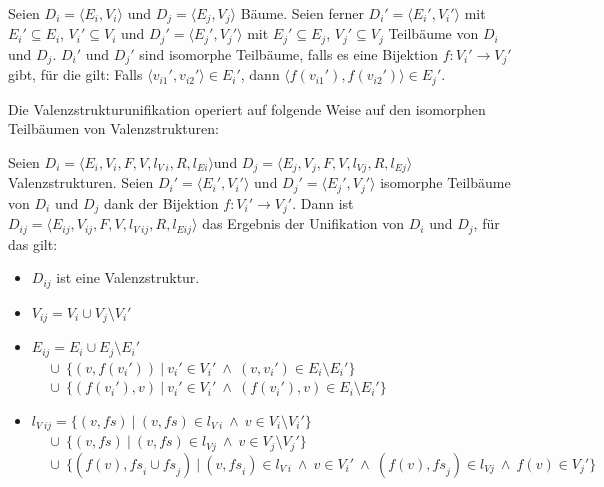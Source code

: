 \begin{definition}
Seien $D_i = \langle E_i,V_i \rangle$ und $D_j = \langle E_j,V_j \rangle$ Bäume.
Seien ferner $D_i' = \langle E_i', V_i' \rangle$ mit $E_i' \subseteq E_i$, $V_i' \subseteq V_i$ und $D_j' = \langle E_j', V_j' \rangle$ mit $E_j' \subseteq E_j$, $V_j' \subseteq V_j$ Teilbäume von $D_i$ und $D_j$. $D_i'$ und $D_j'$ sind isomorphe Teilbäume, falls es eine Bijektion $f:V_i' \to V_j'$ gibt, für die gilt: Falls $\langle v_{i1}', v_{i2}' \rangle \in E_i'$, dann $\langle f(v_{i1}'), f(v_{i2}') \rangle \in E_j'$.
\end{definition}
Die Valenzstrukturunifikation operiert auf folgende Weise auf den isomorphen Teilbäumen von Valenzstrukturen:

\begin{definition}[Valenzstrukturunifikation]
Seien $D_i = \langle E_i,V_i,F,V,l_{V\!\!\:i},R,l_{Ei} \rangle$\linebreak und $D_j = \langle E_j,V_j,F,V,l_{V\!j},R,l_{Ej} \rangle$ Valenzstrukturen. Seien $D_i' = \langle E_i', V_i' \rangle$ und $D_j' = \langle E_j', V_j' \rangle$ isomorphe Teilbäume von $D_i$ und $D_j$ dank der Bijektion $f:V_i' \to V_j'$.  Dann ist $D_{ij} = \langle E_{ij},V_{ij},F,V,l_{V\!\!\:ij},R,l_{Eij} \rangle$ das Ergebnis der Unifikation von $D_i$ und $D_j$, für das gilt:
\begin{itemize}
  \item $D_{ij}$ ist eine Valenzstruktur.
  \item $V_{ij} = V_i \cup V_j \setminus V_i'$
  \item $E_{ij} = E_i \cup E_j \setminus E_i' $\\
                 $~~~~~ \cup \ \{ (v, f(v_i')) \ | \ v_i' \in V_i' \ \wedge \ (v,v_i') \in E_i \setminus E_i' \}$ \\
                 $~~~~~ \cup \ \{ (f(v_i'),v) \ | \ v_i' \in V_i' \ \wedge \ (f(v_i'),v) \in E_i \setminus E_i'  \}$
  \item $l_{V\!\!\:ij} =  \{ (v,\mathit{fs}) \ | \ (v,\mathit{fs}) \in l_{V\!\!\:i} \ \wedge \ v \in V_i \setminus V_i' \} $ \\
                 $~~~~~ \cup \ \{ (v,\mathit{fs}) \ | \ (v,\mathit{fs}) \in l_{V\!j} \ \wedge \ v \in V_j \setminus V_j' \} $ \\
                 $~~~~~ \cup \ \{ (f(v),\mathit{fs}_i \cup \mathit{fs}_j) \ | \ (v,\mathit{fs}_i) \in l_{V\!\!\:i} \ \wedge \ v \in V_i' \ \wedge \ (f(v),\mathit{fs}_j) \in l_{V\!j} \ \wedge \ f(v) \in V_j' \} $ \\

\end{itemize}
\end{definition}
